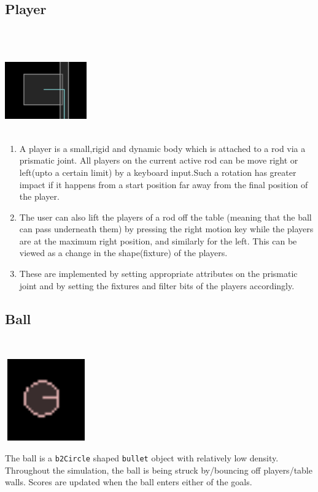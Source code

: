 \documentclass{article}
\begin{document}
\subsection{Player}~\\
\begin{center}
\includegraphics[width=100pt,height=100pt]{Player}~\\
\end{center}
\begin{enumerate}
\item A player is a small,rigid and dynamic body which is attached to a rod via a prismatic joint. All players on the current active rod can be move right or left(upto a certain limit) by a keyboard input.Such a rotation has greater impact if it happens from a start position far away from the final position of the player.
\item The user can also lift the players of a rod off the table (meaning that the ball can pass underneath them) by pressing the right motion key while the players are at the maximum right position, and similarly for the left. This can be viewed as a change in the shape(fixture) of the players.
\item These are implemented by setting appropriate attributes on the prismatic joint and by setting the fixtures and filter bits of the players accordingly.\\
\end{enumerate}

\subsection{Ball}~\\
\begin{center}
\includegraphics[width=100pt,height=100pt]{Ball}~\\
\end{center}
The ball is a \texttt{b2Circle} shaped \texttt{bullet} object with relatively low density. Throughout the simulation, the ball is being struck by/bouncing off players/table walls. Scores are updated when the ball enters either of the goals.\\
\end{document}
